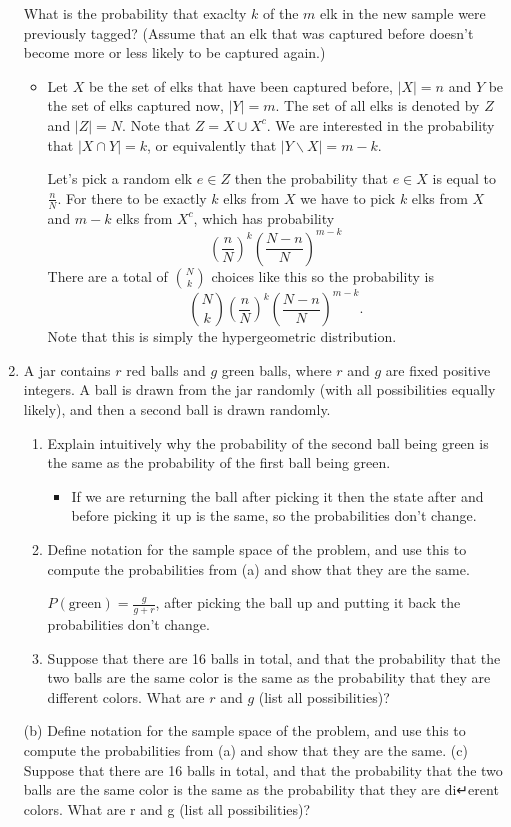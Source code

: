 \documentclass{article}
\begin{document}
\begin{enumerate}
	What is the probability that exaclty $k$ of the $m$ elk in the new sample were previously tagged? (Assume that an elk that was captured before doesn’t become more or less likely to be captured again.)
		\begin{itemize}
			\item Let $X$ be the set of elks that have been captured before, $|X| = n$ and $Y$ be the set of elks captured now, $|Y| = m$. The set of all elks is denoted by $Z$ and $|Z| = N$. Note that $Z = X \cup X^c$. We are interested in the probability that $|X \cap Y| = k$, or equivalently that $|Y \backslash X| = m - k$.

			Let's pick a random elk $e \in Z$ then the probability that $e \in X$ is equal to $\frac{n}{N}$. For there to be exactly $k$ elks from $X$ we have to pick $k$ elks from $X$ and $m - k$ elks from $X^c$, which has probability
			$$
			\left(\frac{n}{N}\right)^k \left(\frac{N - n}{N}\right)^{m - k}
			$$
			There are a total of $\binom{N}{k}$ choices like this so the probability is
			$$
			\binom{N}{k} \left(\frac{n}{N}\right)^k \left(\frac{N - n}{N}\right)^{m - k}.
			$$
			Note that this is simply the hypergeometric distribution.
		\end{itemize}
	\item A jar contains $r$ red balls and $g$ green balls, where $r$ and $g$ are fixed positive integers. A ball is drawn from the jar randomly (with all possibilities equally likely), and then a second ball is drawn randomly.
		\begin{enumerate}
			\item Explain intuitively why the probability of the second ball being green is the same as the probability of the first ball being green.
				\begin{itemize}
					\item If we are returning the ball after picking it then the state after and before picking it up is the same, so the probabilities don't change.
				\end{itemize}
			\item Define notation for the sample space of the problem, and use this to compute the probabilities from (a) and show that they are the same.
				\begin{itemize}
					$P(\text{green}) = \frac{g}{g + r}$, after picking the ball up and putting it back the probabilities don't change.
				\end{itemize}
			\item Suppose that there are 16 balls in total, and that the probability that the two balls are the same color is the same as the probability that they are different colors. What are $r$ and $g$ (list all possibilities)?
		\end{enumerate}
(b) Define notation for the sample space of the problem, and use this to compute
the probabilities from (a) and show that they are the same.
(c) Suppose that there are 16 balls in total, and that the probability that the two
balls are the same color is the same as the probability that they are di↵erent colors.
What are r and g (list all possibilities)?
\end{enumerate}
\end{document}
